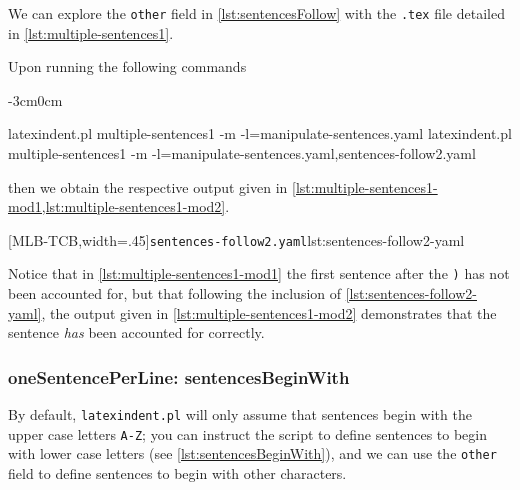 \documentclass[10pt]{article}
\newenvironment{widepage}{\begin{adjustwidth}{-3cm}{0cm}}{\end{adjustwidth}}
\begin{document}
 \begin{example}
 We can explore the \texttt{other} field in \cref{lst:sentencesFollow} with the
 \texttt{.tex} file detailed in \cref{lst:multiple-sentences1}.


 Upon running the following commands  
 \begin{widepage}

  \begin{commandshell}
latexindent.pl multiple-sentences1 -m -l=manipulate-sentences.yaml
latexindent.pl multiple-sentences1 -m -l=manipulate-sentences.yaml,sentences-follow2.yaml
\end{commandshell}

 \end{widepage}
 then we obtain the respective output given in
 \cref{lst:multiple-sentences1-mod1,lst:multiple-sentences1-mod2}.

 \begin{cmhtcbraster}[
   raster force size=false,
   raster column 1/.style={add to width=1cm},
  ]
  [MLB-TCB,width=.45\textwidth]{\texttt{sentences-follow2.yaml}}{lst:sentences-follow2-yaml}
 \end{cmhtcbraster}

 Notice that in \cref{lst:multiple-sentences1-mod1} the first sentence after the
 \texttt{)} has not been accounted for, but that following the inclusion of
 \cref{lst:sentences-follow2-yaml}, the output given in
 \cref{lst:multiple-sentences1-mod2} demonstrates that the sentence \emph{has} been
 accounted for correctly.
 \end{example}

\subsubsection{oneSentencePerLine: sentencesBeginWith}
 By default, \texttt{latexindent.pl} will only assume that sentences begin with the upper
 case letters \texttt{A-Z}; you can instruct the script to define sentences to begin with
 lower case letters (see \cref{lst:sentencesBeginWith}), and we can use the
 \texttt{other} field to define sentences to begin with other characters.
\end{document}
